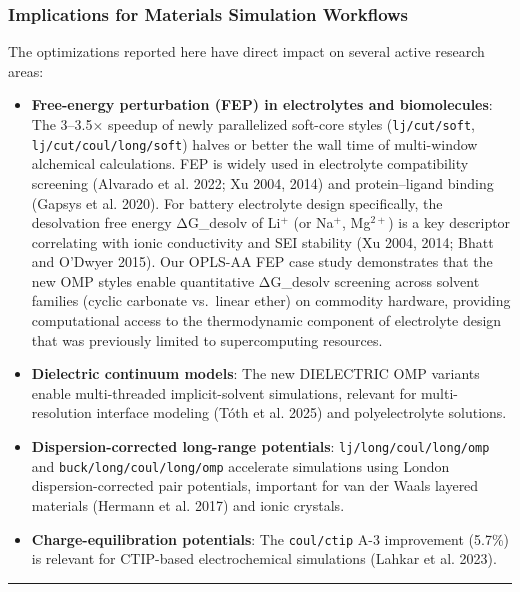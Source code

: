 \documentclass[
  11pt,
]{article}
\begin{document}
\subsubsection{Implications for Materials Simulation
Workflows}\label{implications-for-materials-simulation-workflows}

The optimizations reported here have direct impact on several active
research areas:

\begin{itemize}
\item
  \textbf{Free-energy perturbation (FEP) in electrolytes and
  biomolecules}: The 3--3.5\(\times\) speedup of newly parallelized
  soft-core styles (\texttt{lj/cut/soft},
  \texttt{lj/cut/coul/long/soft}) halves or better the wall time of
  multi-window alchemical calculations. FEP is widely used in
  electrolyte compatibility screening ({Alvarado et al.} 2022; Xu 2004,
  2014) and protein--ligand binding ({Gapsys et al.} 2020). For battery
  electrolyte design specifically, the desolvation free energy
  ΔG\_desolv of Li\(^{+}\) (or Na\(^{+}\), Mg\(^{2+}\)) is a key
  descriptor correlating with ionic conductivity and SEI stability (Xu
  2004, 2014; Bhatt and O'Dwyer 2015). Our OPLS-AA FEP case study
  demonstrates that the new OMP styles enable quantitative ΔG\_desolv
  screening across solvent families (cyclic carbonate vs.~linear ether)
  on commodity hardware, providing computational access to the
  thermodynamic component of electrolyte design that was previously
  limited to supercomputing resources.
\item
  \textbf{Dielectric continuum models}: The new DIELECTRIC OMP variants
  enable multi-threaded implicit-solvent simulations, relevant for
  multi-resolution interface modeling (Tóth et al. 2025) and
  polyelectrolyte solutions.
\item
  \textbf{Dispersion-corrected long-range potentials}:
  \texttt{lj/long/coul/long/omp} and \texttt{buck/long/coul/long/omp}
  accelerate simulations using London dispersion-corrected pair
  potentials, important for van der Waals layered materials (Hermann et
  al. 2017) and ionic crystals.
\item
  \textbf{Charge-equilibration potentials}: The \texttt{coul/ctip} A-3
  improvement (5.7\%) is relevant for CTIP-based electrochemical
  simulations ({Lahkar et al.} 2023).
\end{itemize}

\begin{center}\rule{0.5\linewidth}{0.5pt}\end{center}
\end{document}
